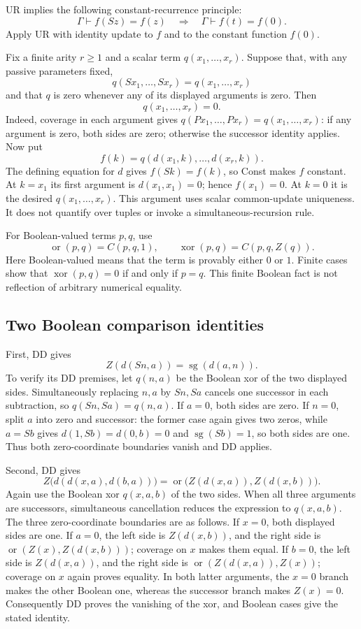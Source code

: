 UR implies the following constant-recurrence principle:
\[
 \Gamma\vdash f(Sz)=f(z)\quad\Longrightarrow\quad
 \Gamma\vdash f(t)=f(0).
 \tag{Const}
\]
Apply UR with identity update to $f$ and to the constant function $f(0)$.

Fix a finite arity $r\geq1$ and a scalar term $q(x_1,\ldots,x_r)$.
Suppose that, with any passive parameters fixed,
\[
 q(Sx_1,\ldots,Sx_r)=q(x_1,\ldots,x_r)
\]
and that $q$ is zero whenever any of its displayed arguments is zero.
Then
\[
                         q(x_1,\ldots,x_r)=0.             \tag{DD}
\]
Indeed, coverage in each argument gives
$q(Px_1,\ldots,Px_r)=q(x_1,\ldots,x_r)$: if any argument is zero,
both sides are zero; otherwise the successor identity applies.
Now put
\[
 f(k)=q(d(x_1,k),\ldots,d(x_r,k)).
\]
The defining equation for $d$ gives $f(Sk)=f(k)$, so Const makes $f$
constant. At $k=x_1$ its first argument is $d(x_1,x_1)=0$; hence
$f(x_1)=0$. At $k=0$ it is the desired $q(x_1,\ldots,x_r)$.
This argument uses scalar common-update uniqueness. It does not quantify over
tuples or invoke a simultaneous-recursion rule.

For Boolean-valued terms $p,q$, use
\[
 \operatorname{or}(p,q)=C(p,q,1),\qquad
 \operatorname{xor}(p,q)=C(p,q,Z(q)).
\]
Here Boolean-valued means that the term is provably either $0$ or $1$.
Finite cases show that $\operatorname{xor}(p,q)=0$ if and only if $p=q$.
This finite Boolean fact is not reflection of arbitrary numerical equality.

\subsection{Two Boolean comparison identities}

First, DD gives
\[
 Z(d(Sn,a))=\operatorname{sg}(d(a,n)).
 \tag{B1}\label{eq:ur-strict-complement}
\]
To verify its DD premises, let $q(n,a)$ be the Boolean xor of the two
displayed sides. Simultaneously replacing $n,a$ by $Sn,Sa$ cancels one
successor in each subtraction, so $q(Sn,Sa)=q(n,a)$. If $a=0$, both
sides are zero. If $n=0$, split $a$ into zero and successor: the former
case again gives two zeros, while $a=Sb$ gives
$d(1,Sb)=d(0,b)=0$ and $\operatorname{sg}(Sb)=1$, so both sides are one.
Thus both zero-coordinate boundaries vanish and DD applies.

Second, DD gives
\[
 Z\bigl(d(d(x,a),d(b,a))\bigr)
 =\operatorname{or}\bigl(Z(d(x,a)),Z(d(x,b))\bigr).
 \tag{B2}\label{eq:ur-comparison-join}
\]
Again use the Boolean xor $q(x,a,b)$ of the two sides.
When all three arguments are successors, simultaneous cancellation
reduces the expression to $q(x,a,b)$.
The three zero-coordinate boundaries are as follows.
If $x=0$, both displayed sides are one.
If $a=0$, the left side is $Z(d(x,b))$, and the right side is
$\operatorname{or}(Z(x),Z(d(x,b)))$; coverage on $x$ makes them equal.
If $b=0$, the left side is $Z(d(x,a))$, and the right side is
$\operatorname{or}(Z(d(x,a)),Z(x))$; coverage on $x$ again proves equality.
In both latter arguments, the $x=0$ branch makes the other Boolean one,
whereas the successor branch makes $Z(x)=0$.
Consequently DD proves the vanishing of the xor, and Boolean cases
give the stated identity.

